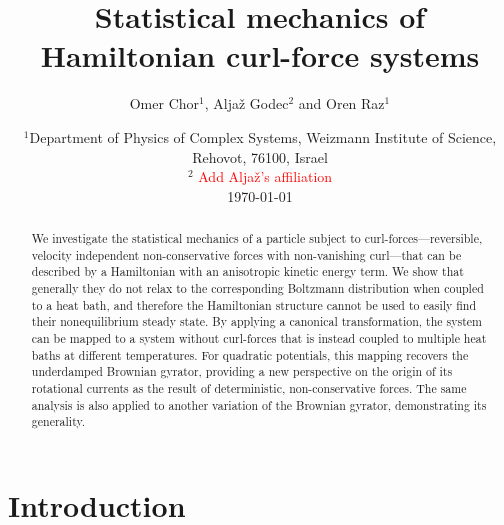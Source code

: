 \documentclass[a4paper]{article}
\numberwithin{equation}{section}
\begin{document}
\title{Statistical mechanics of Hamiltonian curl-force systems}

\author{%
Omer Chor$^{1}$, Alja\v{z} Godec$^{2}$ and Oren Raz$^{1}$}

\date{
$^{1}$Department of Physics of Complex Systems, Weizmann Institute of Science, Rehovot, 76100, Israel
\\
$^{2}$ \textcolor{red}{Add Alja\v{z}'s affiliation}\\[2ex]
\today}

\maketitle





\begin{abstract}
We investigate the statistical mechanics of a particle subject to curl-forces---reversible, velocity independent non-conservative forces with non-vanishing curl---that can be described by a Hamiltonian with an anisotropic kinetic energy term. We show that generally they do not relax to the corresponding Boltzmann distribution when coupled to a heat bath, and therefore the Hamiltonian structure cannot be used to easily find their nonequilibrium steady state. By applying a canonical transformation, the system can be mapped to a system without curl-forces that is instead coupled to multiple heat baths at different temperatures. For quadratic potentials, this mapping recovers the underdamped Brownian gyrator, providing a new perspective on the origin of its rotational currents as the result of deterministic, non-conservative forces. The same analysis is also applied to another variation of the Brownian gyrator, demonstrating its generality.
\end{abstract}

\maketitle

\section{Introduction}
\label{sec:Intro}

\end{document}
